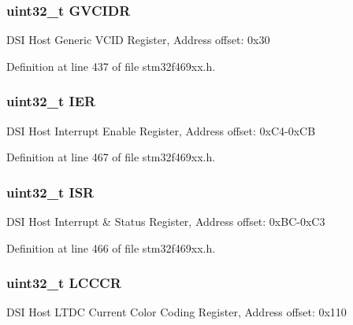 \subsubsection[{\texorpdfstring{G\+V\+C\+I\+DR}{GVCIDR}}]{ uint32\+\_\+t G\+V\+C\+I\+DR}\hypertarget{struct_d_s_i___type_def_a6af90ed872fae7ae9c9137fd3dc0c603}{}\label{struct_d_s_i___type_def_a6af90ed872fae7ae9c9137fd3dc0c603}
D\+SI Host Generic V\+C\+ID Register, Address offset\+: 0x30 

Definition at line 437 of file stm32f469xx.\+h.

\subsubsection[{\texorpdfstring{I\+ER}{IER}}]{ uint32\+\_\+t I\+ER}\hypertarget{struct_d_s_i___type_def_a1eaca686abd3c27a85bd13346cb70163}{}\label{struct_d_s_i___type_def_a1eaca686abd3c27a85bd13346cb70163}
D\+SI Host Interrupt Enable Register, Address offset\+: 0x\+C4-\/0x\+CB 

Definition at line 467 of file stm32f469xx.\+h.

\subsubsection[{\texorpdfstring{I\+SR}{ISR}}]{ uint32\+\_\+t I\+SR}\hypertarget{struct_d_s_i___type_def_a973944212869adb4c6fb039a0a16c039}{}\label{struct_d_s_i___type_def_a973944212869adb4c6fb039a0a16c039}
D\+SI Host Interrupt \& Status Register, Address offset\+: 0x\+B\+C-\/0x\+C3 

Definition at line 466 of file stm32f469xx.\+h.

\subsubsection[{\texorpdfstring{L\+C\+C\+CR}{LCCCR}}]{ uint32\+\_\+t L\+C\+C\+CR}\hypertarget{struct_d_s_i___type_def_aba277f1cd31da079d07a3ad1d6775b54}{}\label{struct_d_s_i___type_def_aba277f1cd31da079d07a3ad1d6775b54}
D\+SI Host L\+T\+DC Current Color Coding Register, Address offset\+: 0x110 

